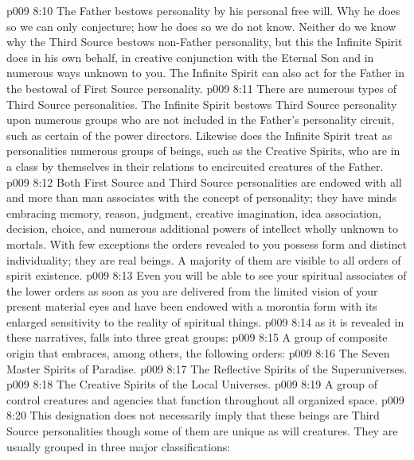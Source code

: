 \pc \vs p009 8:10 The Father bestows personality by his personal free will. Why he does so we can only conjecture; how he does so we do not know. Neither do we know why the Third Source bestows non\hyp{}Father personality, but this the Infinite Spirit does in his own behalf, in creative conjunction with the Eternal Son and in numerous ways unknown to you. The Infinite Spirit can also act for the Father in the bestowal of First Source personality.\plusone
\pc \vs p009 8:11 There are numerous types of Third Source personalities. The Infinite Spirit bestows Third Source personality upon numerous groups who are not included in the Father’s personality circuit, such as certain of the power directors. Likewise does the Infinite Spirit treat as personalities numerous groups of beings, such as the Creative Spirits, who are in a class by themselves in their relations to encircuited creatures of the Father.
\vs p009 8:12 Both First Source and Third Source personalities are endowed with all and more than man associates with the concept of personality; they have minds embracing memory, reason, judgment, creative imagination, idea association, decision, choice, and numerous additional powers of intellect wholly unknown to mortals. With few exceptions the orders revealed to you possess form and distinct individuality; they are real beings. A majority of them are visible to all orders of spirit existence.
\vs p009 8:13 Even you will be able to see your spiritual associates of the lower orders as soon as you are delivered from the limited vision of your present material eyes and have been endowed with a morontia form with its enlarged sensitivity to the reality of spiritual things.
\pc \vs p009 8:14  as it is revealed in these narratives, falls into three great groups:
\pc \vs p009 8:15 \bibnobreakspace {} A group of composite origin that embraces, among others, the following orders:
\pc \vs p009 8:16 \bibnobreakspace The Seven Master Spirits of Paradise.
\vs p009 8:17 \bibnobreakspace The Reflective Spirits of the Superuniverses.
\vs p009 8:18 \bibnobreakspace The Creative Spirits of the Local Universes.
\pc \vs p009 8:19 \bibnobreakspace {} A group of control creatures and agencies that function throughout all organized space.
\pc \vs p009 8:20 \bibnobreakspace {} This designation does not necessarily imply that these beings are Third Source personalities though some of them are unique as will creatures. They are usually grouped in three major classifications:
